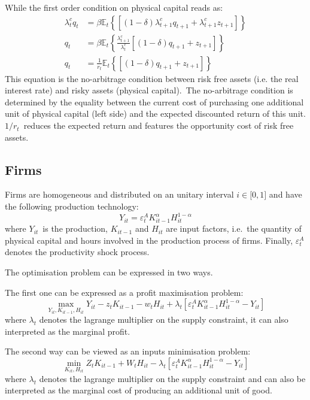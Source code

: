 \documentclass[a4paper,12pt]{article}%
\begin{document}
While the first order condition on physical capital reads as:%
\begin{align}
\lambda_{t}^{c}q_{t}  &  =\beta\mathbb{E}_{t}\left\{  \left[  \overset
{}{\left(  1-\delta\right)  }\lambda_{t+1}^{c}q_{t+1}+\lambda_{t+1}^{c}%
z_{t+1}\right]  \right\} \\
q_{t}  &  =\beta\mathbb{E}_{t}\left\{  \frac{\lambda_{t+1}^{c}}{\lambda
_{t}^{c}}\left[  \overset{}{\left(  1-\delta\right)  }q_{t+1}+z_{t+1}\right]
\right\} \\
q_{t}  &  =\frac{1}{r_{t}}\mathbb{E}_{t}\left\{  \left[  \overset{}{\left(
1-\delta\right)  }q_{t+1}+z_{t+1}\right]  \right\}
\end{align}
This equation is the no-arbitrage condition between risk free assets (i.e. the
real interest rate) and risky assets (physical capital).\ The no-arbitrage
condition is determined by the equality between the current cost of purchasing
one additional unit of physical capital (left side) and the expected
discounted return of this unit. $1/r_{t}$\ reduces the expected return and
features the opportunity cost of risk free assets.

\subsection{Firms}

Firms are homogeneous and distributed on an unitary interval $i\in\lbrack0,1]$
and have the following production technology:
\begin{equation}
Y_{it}=\varepsilon_{t}^{A}{}K_{it-1}^{\alpha}H_{it}^{1-\alpha}{}
\label{eq firms production fctn}%
\end{equation}
where $Y_{it}$\ is the production, $K_{it-1}$ and $H_{it}$ are input factors,
i.e.\ the quantity of physical capital and hours involved in the production
process of firms. Finally, $\varepsilon_{t}^{A}$ denotes the productivity
shock process.

The optimisation problem can be expressed in two ways.\ 

The first one can be expressed as a profit maximisation problem:
\[
\max_{Y_{it},K_{it-1},H_{it}}Y_{it}-z_{t}K_{it-1}-w_{t}H_{it}+\lambda
_{t}\left[  \varepsilon_{t}^{A}K_{it-1}^{\alpha}{}H_{it}^{1-\alpha}{}%
-Y_{it}\right]
\]
where $\lambda_{t}$ denotes the lagrange multiplier on the supply constraint,
it can also interpreted as the marginal profit.

The second way can be viewed as an inputs minimisation problem:%
\[
\min_{K_{it},H_{it}}Z_{t}K_{it-1}+W_{t}H_{it}-\lambda_{t}\left[
\varepsilon_{t}^{A}K_{it-1}^{\alpha}{}H_{it}^{1-\alpha}{}-Y_{it}\right]
\]
where $\lambda_{t}$ denotes the lagrange multiplier on the supply constraint
and can also be interpreted as the marginal cost of producing an additional
unit of good.
\end{document}
